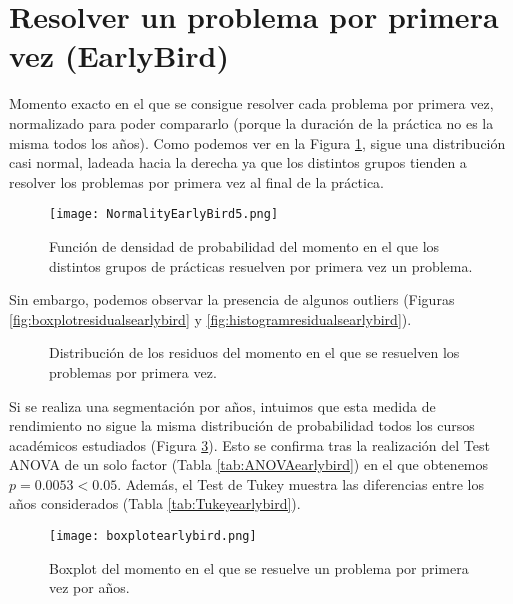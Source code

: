 \section{Resolver un problema por primera vez (EarlyBird)}

Momento exacto en el que se consigue resolver cada problema por primera vez, normalizado para poder compararlo (porque la duración de la práctica no es la misma todos los años). Como podemos ver en la Figura \ref{fig:densityplotearlybird}, sigue una distribución casi normal, ladeada hacia la derecha ya que los distintos grupos tienden a resolver los problemas por primera vez al final de la práctica.

\begin{figure}[H]
    \centering
    \texttt{[image: NormalityEarlyBird5.png]}
    \caption{Función de densidad de probabilidad del momento en el que los distintos grupos de prácticas resuelven por primera vez un problema.}
    \label{fig:densityplotearlybird}
\end{figure}

Sin embargo, podemos observar la presencia de algunos outliers (Figuras \ref{fig:boxplotresidualsearlybird} y \ref{fig:histogramresidualsearlybird}).

\begin{figure}[H]
\centering
{}\qquad
{}
\caption{Distribución de los residuos del momento en el que se resuelven los problemas por primera vez.}
\label{fig:earlybird}
\end{figure}

Si se realiza una segmentación por años, intuimos que esta medida de rendimiento no sigue la misma distribución de probabilidad todos los cursos académicos estudiados (Figura \ref{fig:boxplotearlybird}). Esto se confirma tras la realización del Test ANOVA de un solo factor (Tabla \ref{tab:ANOVAearlybird}) en el que obtenemos $p = 0.0053 < 0.05$. Además, el Test de Tukey muestra las diferencias entre los años considerados (Tabla \ref{tab:Tukeyearlybird}).

\begin{figure}[H]
    \centering
    \texttt{[image: boxplotearlybird.png]}
    \caption{Boxplot del momento en el que se resuelve un problema por primera vez por años.}
    \label{fig:boxplotearlybird}
\end{figure}

